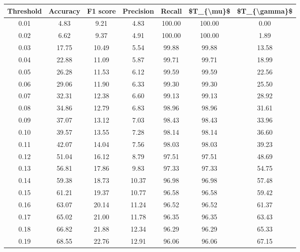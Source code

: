 \begin{tabular}{|c|c|c|c|c|c|c|}
\toprule
 Threshold &  Accuracy &  F1 score &  Precision &  Recall &  \$T\_\{\textbackslash mu\}\$ &  \$T\_\{\textbackslash gamma\}\$ \\
\hline
      0.01 &      4.83 &      9.21 &       4.83 &  100.00 &     100.00 &          0.00 \\
      0.02 &      6.62 &      9.37 &       4.91 &  100.00 &     100.00 &          1.89 \\
      0.03 &     17.75 &     10.49 &       5.54 &   99.88 &      99.88 &         13.58 \\
      0.04 &     22.88 &     11.09 &       5.87 &   99.71 &      99.71 &         18.99 \\
      0.05 &     26.28 &     11.53 &       6.12 &   99.59 &      99.59 &         22.56 \\
      0.06 &     29.06 &     11.90 &       6.33 &   99.30 &      99.30 &         25.50 \\
      0.07 &     32.31 &     12.38 &       6.60 &   99.13 &      99.13 &         28.92 \\
      0.08 &     34.86 &     12.79 &       6.83 &   98.96 &      98.96 &         31.61 \\
      0.09 &     37.07 &     13.12 &       7.03 &   98.43 &      98.43 &         33.96 \\
      0.10 &     39.57 &     13.55 &       7.28 &   98.14 &      98.14 &         36.60 \\
      0.11 &     42.07 &     14.04 &       7.56 &   98.03 &      98.03 &         39.23 \\
      0.12 &     51.04 &     16.12 &       8.79 &   97.51 &      97.51 &         48.69 \\
      0.13 &     56.81 &     17.86 &       9.83 &   97.33 &      97.33 &         54.75 \\
      0.14 &     59.38 &     18.73 &      10.37 &   96.98 &      96.98 &         57.48 \\
      0.15 &     61.21 &     19.37 &      10.77 &   96.58 &      96.58 &         59.42 \\
      0.16 &     63.07 &     20.14 &      11.24 &   96.52 &      96.52 &         61.37 \\
      0.17 &     65.02 &     21.00 &      11.78 &   96.35 &      96.35 &         63.43 \\
      0.18 &     66.82 &     21.88 &      12.34 &   96.29 &      96.29 &         65.33 \\
      0.19 &     68.55 &     22.76 &      12.91 &   96.06 &      96.06 &         67.15 \\

\end{tabular}
